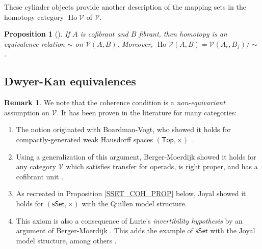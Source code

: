\documentclass[a4paper,10pt
,draft
]{article}%
\numberwithin{equation}{section}
\numberwithin{figure}{section}
\newtheorem{proposition}[equation]{Proposition}%
\theoremstyle{definition} %
\newtheorem{remark}[equation]{Remark}%
\newcommand{\Top}{\ensuremath{\mathsf{Top}}}
\newcommand{\sSet}{\ensuremath{\mathsf{sSet}}}%
\DeclareMathOperator{\Ho}{Ho}
\newcommand{\V}{\ensuremath{\mathcal V}}
\newcommand{\1}{\ensuremath{\mathbbm 1}}%
\begin{document}
These cylinder objects provide another description of the mapping sets in the homotopy category $\Ho \V$ of $\V$.

\begin{proposition}[{\cite[1.2.10]{Hov99}}]
      If $A$ is cofibrant and $B$ fibrant, then
      homotopy is an equivalence relation $\sim$ on $\V(A,B)$.
      Moreover, 
      $\Ho \V (A,B) = \V(A_c, B_f)/\sim$.
\end{proposition}










\subsection{Dwyer-Kan equivalences}\label{DK_SEC}








\begin{remark}
      \label{COH_EX_REM}
      We note that the coherence condition is a \textit{non-equivariant} assumption on $\V$.
      It has been proven in the literature for many categories:
      \begin{enumerate}[label = (\roman*)]
      \item The notion originated with Boardman-Vogt, who showed it holds for compactly-generated weak Hausdorff spaces $(\Top, \times)$ \cite[Lem. 4.16]{BV73}.
      \item Using a generalization of this argument, Berger-Moerdijk showed it holds for any category $\V$ which satisfies transfer for operads, is right proper, and has a cofibrant unit \cite[Prop. 2.24]{BM13}.
      \item As recreated in Proposition \ref{SSET_COH_PROP} below, Joyal showed it holds for $(\sSet, \times)$ with the Quillen model structure.
      \item This axiom is also a consequence of Lurie's \textit{invertibility hypothesis} \cite[A.3.2.12]{Lur09} by an argument of Berger-Moerdijk \cite[Rem. 2.19]{BM13}.
            This adds the example of $\sSet$ with the Joyal model structure, among others \cite[A.3.2.23]{Lur09}.
      \end{enumerate}
\end{remark}
\end{document}
